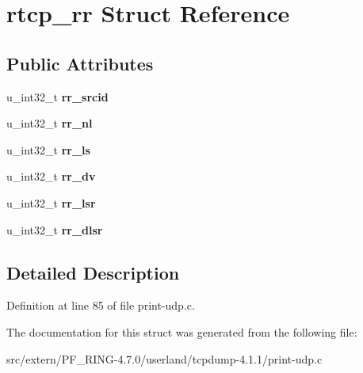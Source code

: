 \hypertarget{structrtcp__rr}{
\section{rtcp\_\-rr Struct Reference}
\label{structrtcp__rr}
}
\subsection*{Public Attributes}
\begin{DoxyCompactItemize}
\item 
\hypertarget{structrtcp__rr_a773af7a3cbee9be874d3d1f792690fc1}{
u\_\-int32\_\-t {\bfseries rr\_\-srcid}}
\label{structrtcp__rr_a773af7a3cbee9be874d3d1f792690fc1}

\item 
\hypertarget{structrtcp__rr_a5fbcb79f3990ab54ca5b21367d94d269}{
u\_\-int32\_\-t {\bfseries rr\_\-nl}}
\label{structrtcp__rr_a5fbcb79f3990ab54ca5b21367d94d269}

\item 
\hypertarget{structrtcp__rr_a466e8724c21e9014682adf900a0db772}{
u\_\-int32\_\-t {\bfseries rr\_\-ls}}
\label{structrtcp__rr_a466e8724c21e9014682adf900a0db772}

\item 
\hypertarget{structrtcp__rr_a141162864e55c374cb1bde9ee2dddc8f}{
u\_\-int32\_\-t {\bfseries rr\_\-dv}}
\label{structrtcp__rr_a141162864e55c374cb1bde9ee2dddc8f}

\item 
\hypertarget{structrtcp__rr_a0a872f8924ad58a740868a248648c162}{
u\_\-int32\_\-t {\bfseries rr\_\-lsr}}
\label{structrtcp__rr_a0a872f8924ad58a740868a248648c162}

\item 
\hypertarget{structrtcp__rr_a7901e331758a21af9414f90f8e34208f}{
u\_\-int32\_\-t {\bfseries rr\_\-dlsr}}
\label{structrtcp__rr_a7901e331758a21af9414f90f8e34208f}

\end{DoxyCompactItemize}


\subsection{Detailed Description}


Definition at line 85 of file print-\/udp.c.



The documentation for this struct was generated from the following file:\begin{DoxyCompactItemize}
\item 
src/extern/PF\_\-RING-\/4.7.0/userland/tcpdump-\/4.1.1/print-\/udp.c\end{DoxyCompactItemize}
